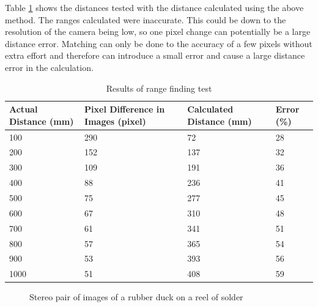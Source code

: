 Table \ref{table:range} shows the distances tested with the distance calculated using the above method. The ranges calculated were inaccurate. This could be down to the resolution of the camera being low, so one pixel change can potentially be a large distance error. Matching can only be done to the accuracy of a few pixels without extra effort and therefore can introduce a small error and cause a large distance error in the calculation. 

\begin{table}
\centering
\caption{Results of range finding test}
\label{table:range}
\begin{tabular}{|p{3cm}|p{3cm}|p{3cm}|p{3cm}|} \hline
Actual Distance (mm) & Pixel Difference in Images (pixel) & Calculated Distance (mm) & Error (\%) \\ \hline
100 & 290 & 72 & 28\\ 
200 & 152 & 137 & 32\\ 
300 & 109 & 191 & 36\\ 
400 & 88 & 236 & 41\\ 
500 & 75 & 277 & 45\\ 
600 & 67 & 310 & 48\\ 
700 & 61 & 341 & 51\\ 
800 & 57 & 365 & 54\\ 
900 & 53 & 393 & 56\\ 
1000 & 51 & 408 & 59\\ \hline
\end{tabular}
\end{table}
\begin{figure}
\centering
{}
\caption{Stereo pair of images of a rubber duck on a reel of solder}
\label{fig:duck:stereo}
\end{figure}


